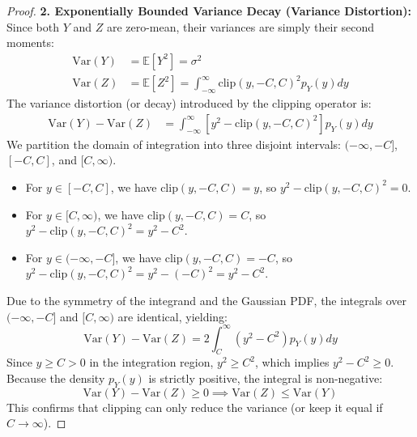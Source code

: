 \documentclass{article}
\theoremstyle{plain}
\theoremstyle{definition}
\theoremstyle{remark}
\begin{document}
\begin{proof}
\textbf{2. Exponentially Bounded Variance Decay (Variance Distortion):}
Since both $Y$ and $Z$ are zero-mean, their variances are simply their second moments:
\begin{align}
    \text{Var}(Y) &= \mathbb{E}[Y^2] = \sigma^2 \\
    \text{Var}(Z) &= \mathbb{E}[Z^2] = \int_{-\infty}^{\infty} \text{clip}(y, -C, C)^2 p_Y(y) dy
\end{align}
The variance distortion (or decay) introduced by the clipping operator is:
\begin{align}
    \text{Var}(Y) - \text{Var}(Z) &= \int_{-\infty}^{\infty} \left[ y^2 - \text{clip}(y, -C, C)^2 \right] p_Y(y) dy
\end{align}
We partition the domain of integration into three disjoint intervals: $(-\infty, -C]$, $[-C, C]$, and $[C, \infty)$.
\begin{itemize}
    \item For $y \in [-C, C]$, we have $\text{clip}(y, -C, C) = y$, so $y^2 - \text{clip}(y, -C, C)^2 = 0$.
    \item For $y \in [C, \infty)$, we have $\text{clip}(y, -C, C) = C$, so $y^2 - \text{clip}(y, -C, C)^2 = y^2 - C^2$.
    \item For $y \in (-\infty, -C]$, we have $\text{clip}(y, -C, C) = -C$, so $y^2 - \text{clip}(y, -C, C)^2 = y^2 - (-C)^2 = y^2 - C^2$.
\end{itemize}
Due to the symmetry of the integrand and the Gaussian PDF, the integrals over $(-\infty, -C]$ and $[C, \infty)$ are identical, yielding:
\begin{equation}
    \text{Var}(Y) - \text{Var}(Z) = 2 \int_{C}^{\infty} (y^2 - C^2) p_Y(y) dy
\end{equation}
Since $y \ge C > 0$ in the integration region, $y^2 \ge C^2$, which implies $y^2 - C^2 \ge 0$. Because the density $p_Y(y)$ is strictly positive, the integral is non-negative:
\begin{equation}
    \text{Var}(Y) - \text{Var}(Z) \ge 0 \implies \text{Var}(Z) \le \text{Var}(Y)
\end{equation}
This confirms that clipping can only reduce the variance (or keep it equal if $C \to \infty$).


\end{proof}
\end{document}
